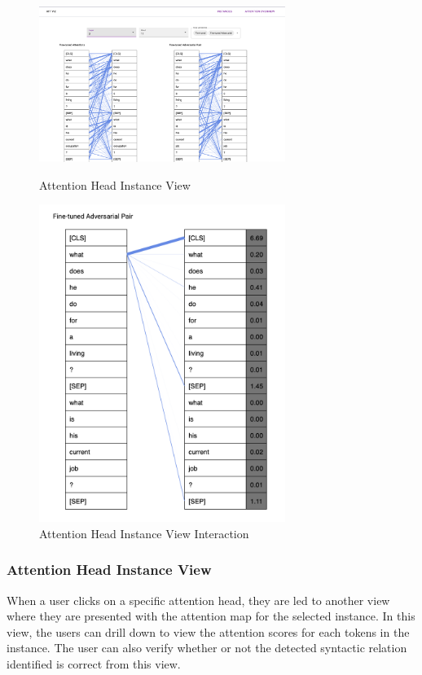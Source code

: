 \documentclass[journal]{vgtc}                %
\begin{document}
\begin{figure}[!htb]
    \centering
    
    \includegraphics[width=8cm]{figures/Attention_Head_Instance_View.png}
    \caption{Attention Head Instance View}
    \label{fig:attention_head_instance_view_visualization}
    
    \includegraphics[width=8cm]{figures/Attention_Head_Instance_View_interaction_2.png}
    \caption{Attention Head Instance View Interaction}
    \label{fig:attention_head_instance_view_interaction_visualization}
    
\end{figure}

\subsubsection{Attention Head Instance View}
When a user clicks on a specific attention head, they are led to another view where they are presented with the attention map for the selected instance. In this view, the users can drill down to view the attention scores for each tokens in the instance. The user can also verify whether or not the detected syntactic relation identified is correct from this view. 
\end{document}
